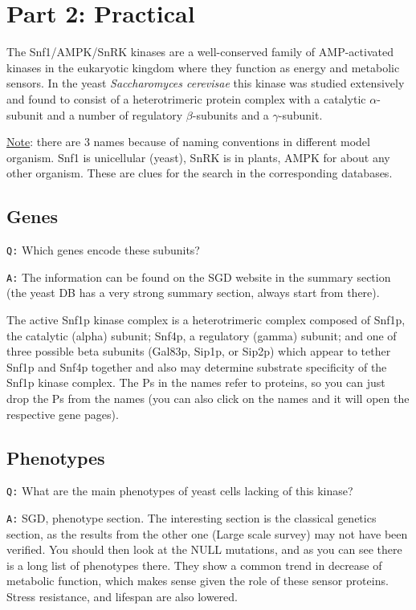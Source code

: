 \documentclass[11pt, a4paper,titlepage]{article}
\begin{document}
\section*{Part 2: Practical}

The Snf1/AMPK/SnRK kinases are a well-conserved family of
AMP-activated kinases in the eukaryotic kingdom where they function as
energy and metabolic sensors. In the yeast \emph{Saccharomyces
  cerevisae} this kinase was studied extensively and found to consist
of a heterotrimeric protein complex with a catalytic $\alpha$-subunit
and a number of regulatory $\beta$-subunits and a $\gamma$-subunit.

\noindent\underline{Note}: there are 3 names because of naming
conventions in different model organism. Snf1 is unicellular (yeast),
SnRK is in plants, AMPK for about any other organism. These are clues
for the search in the corresponding databases.

\subsection*{Genes}

\texttt{Q:} Which genes encode these subunits?
\smallskip

\noindent\texttt{A:} The information can be found on the SGD website
in the summary section (the yeast DB has a very strong summary
section, always start from there).  

The active Snf1p kinase complex is a heterotrimeric complex composed
of Snf1p, the catalytic (alpha) subunit; Snf4p, a regulatory (gamma)
subunit; and one of three possible beta subunits (Gal83p, Sip1p, or
Sip2p) which appear to tether Snf1p and Snf4p together and also may
determine substrate specificity of the Snf1p kinase complex. The Ps in
the names refer to proteins, so you can just drop the Ps from the names
(you can also click on the names and it will open the respective gene
pages).

\subsection*{Phenotypes}
\texttt{Q:} What are the main phenotypes of yeast cells lacking of
this kinase?
\smallskip

\noindent\texttt{A:} SGD, phenotype section. The interesting section
is the classical genetics section, as the results from the other one
(Large scale survey) may not have been verified. You should then look
at the NULL mutations, and as you can see there is a long list of
phenotypes there. They show a common trend in decrease of metabolic
function, which makes sense given the role of these sensor
proteins. Stress resistance, and lifespan are also lowered.
\end{document}
